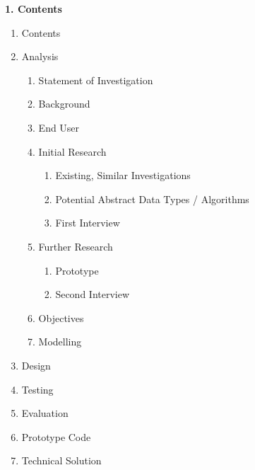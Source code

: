 \documentclass{article}
\begin{document}
\begin{flushleft}
    \huge
    \textbf{1. Contents}
    
    \Large
    \begin{enumerate}
        \item Contents
        \item Analysis
            \begin{enumerate}
                \item Statement of Investigation
                \item Background
                \item End User
                \item Initial Research
                    \begin{enumerate}
                        \item Existing, Similar Investigations
                        \item Potential Abstract Data Types / Algorithms
                        \item First Interview
                    \end{enumerate}
                \item Further Research
                    \begin{enumerate}
                        \item Prototype
                        \item Second Interview
                    \end{enumerate}
                \item Objectives
                \item Modelling
            \end{enumerate}
        \item Design
        \item Testing
        \item Evaluation
        \item Prototype Code
        \item Technical Solution
    \end{enumerate}
    
    \pagebreak
\end{flushleft}












\end{document}
